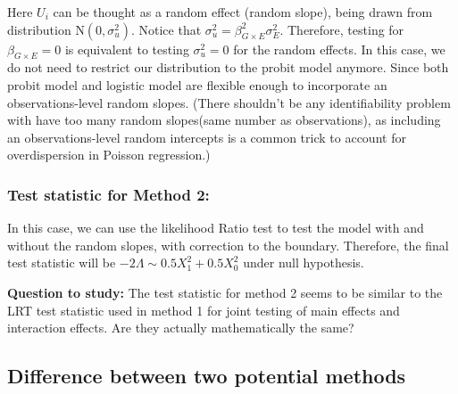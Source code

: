 \documentclass[
]{article}
\begin{document}
Here \(U_i\) can be thought as a random effect (random slope), being
drawn from distribution \(\text{N}(0,\sigma_u^2)\). Notice that
\(\sigma_u^2 = \beta_{G\times E}^2 \sigma_E^2\). Therefore, testing for
\(\beta_{G\times E} =0\) is equivalent to testing \(\sigma_u^2 = 0\) for
the random effects. In this case, we do not need to restrict our
distribution to the probit model anymore. Since both probit model and
logistic model are flexible enough to incorporate an observations-level
random slopes. (There shouldn't be any identifiability problem with have
too many random slopes(same number as observations), as including an
observations-level random intercepts is a common trick to account for
overdispersion in Poisson regression.)

\hypertarget{test-statistic-for-method-2}{%
\subsubsection{Test statistic for Method
2:}\label{test-statistic-for-method-2}}

In this case, we can use the likelihood Ratio test to test the model
with and without the random slopes, with correction to the boundary.
Therefore, the final test statistic will be
\(-2\Lambda \sim 0.5X^2_1 + 0.5X^2_0\) under null hypothesis.

\textbf{Question to study:} The test statistic for method 2 seems to be
similar to the LRT test statistic used in method 1 for joint testing of
main effects and interaction effects. Are they actually mathematically
the same?

\hypertarget{difference-between-two-potential-methods}{%
\subsection{Difference between two potential
methods}\label{difference-between-two-potential-methods}}
\end{document}
